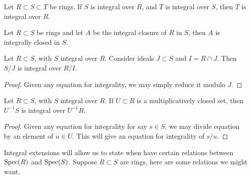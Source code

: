 \documentclass{ximera}
\begin{document}
\begin{corollary}
  Let $R\subset S \subset T$ be rings. If $S$ is integral over $R$,
  and $T$ is integral over $S$, then $T$ is integral over $R$.
\end{corollary}


\begin{corollary}
  Let $R\subset S$ be rings and let $A$ be the integral closure of $R$
  in $S$, then $A$ is integrally closed in $S$.
\end{corollary}




\begin{proposition}
  Let $R\subset S$, with $S$ integral over $R$. Consider ideals
  $J\subset S$ and $I= R\cap J$. Then $S/J$ is integral over $R/I$.
  \begin{proof}
    Given any equation for integrality, we may simply reduce it modulo
    $J$.
  \end{proof}
\end{proposition}

\begin{proposition}\label{P:localint}
  Let $R\subset S$, with $S$ integral over $R$. If $U\subset R$ is a
  multiplicatively closed set, then $U^{-1} S$ is integral over
  $U^{-1} R$.
  \begin{proof}
    Given any equation for integrality for say $s\in S$, we may divide
    equation by an element of $u\in U$. This will give an equation for
    integrality of $s/u$.
  \end{proof}
\end{proposition}


Integral extensions will allow us to state when have certain relations
between $\operatorname{Spec}(R)$ and $\operatorname{Spec}(S)$. Suppose $R\subset S$ are rings,
here are some relations we might want.
\end{document}
